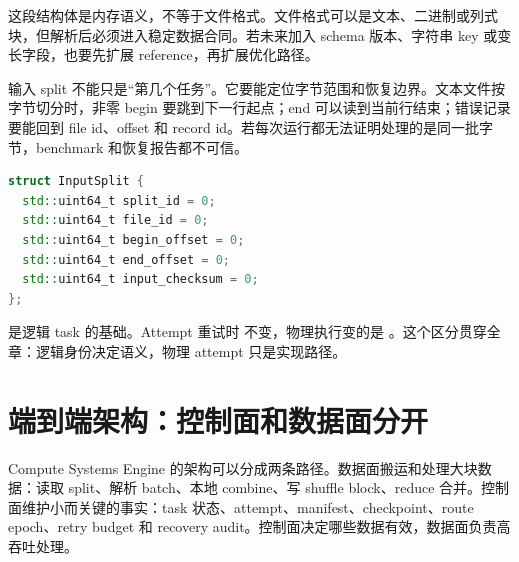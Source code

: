 这段结构体是内存语义，不等于文件格式。文件格式可以是文本、二进制或列式块，但解析后必须进入稳定数据合同。若未来加入 schema 版本、字符串 key 或变长字段，也要先扩展 reference，再扩展优化路径。

输入 split 不能只是“第几个任务”。它要能定位字节范围和恢复边界。文本文件按字节切分时，非零 begin 要跳到下一行起点；end 可以读到当前行结束；错误记录要能回到 file id、offset 和 record id。若每次运行都无法证明处理的是同一批字节，benchmark 和恢复报告都不可信。

\begin{lstlisting}[language=C++,caption={输入分片元数据}]
struct InputSplit {
  std::uint64_t split_id = 0;
  std::uint64_t file_id = 0;
  std::uint64_t begin_offset = 0;
  std::uint64_t end_offset = 0;
  std::uint64_t input_checksum = 0;
};
\end{lstlisting}

 是逻辑 task 的基础。Attempt 重试时  不变，物理执行变的是 。这个区分贯穿全章：逻辑身份决定语义，物理 attempt 只是实现路径。

\section{端到端架构：控制面和数据面分开}

Compute Systems Engine 的架构可以分成两条路径。数据面搬运和处理大块数据：读取 split、解析 batch、本地 combine、写 shuffle block、reduce 合并。控制面维护小而关键的事实：task 状态、attempt、manifest、checkpoint、route epoch、retry budget 和 recovery audit。控制面决定哪些数据有效，数据面负责高吞吐处理。

